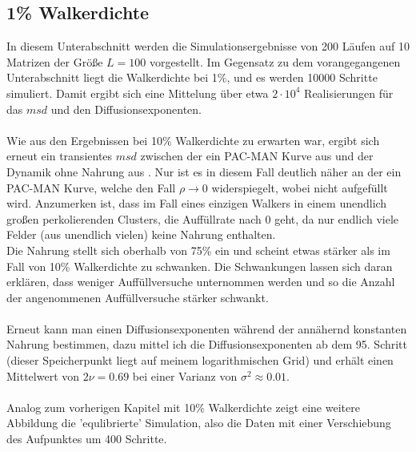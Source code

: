 \documentclass[a4paper, 12pt]{report}
\begin{document}
\subsection{1\% Walkerdichte}

In diesem Unterabschnitt werden die Simulationsergebnisse von 200 Läufen auf 10 Matrizen der Größe $L=100$ vorgestellt. Im Gegensatz zu dem vorangegangenen Unterabschnitt liegt die Walkerdichte bei 1\%, und es werden 10000 Schritte simuliert. Damit ergibt sich eine Mittelung über etwa $2\cdot 10^4$ Realisierungen für das $msd$ und den Diffusionsexponenten.
\\
\\
Wie aus den Ergebnissen bei 10\% Walkerdichte zu erwarten war, ergibt sich erneut ein transientes $msd$ zwischen der ein PAC-MAN Kurve aus \cite{doi:10.1063/1.4999485} und der Dynamik ohne Nahrung aus \cite{PhysRevLett.50.77}. Nur ist es in diesem Fall deutlich näher an der ein PAC-MAN Kurve, welche den Fall $\rho \rightarrow 0$ widerspiegelt, wobei nicht aufgefüllt wird. Anzumerken ist, dass im Fall eines einzigen Walkers in einem unendlich großen perkolierenden Clusters, die Auffüllrate nach $0$ geht, da nur endlich viele Felder (aus unendlich vielen) keine Nahrung enthalten.
\\
Die Nahrung stellt sich oberhalb von 75\% ein und scheint etwas stärker als im Fall von 10\% Walkerdichte zu schwanken. Die Schwankungen lassen sich daran erklären, dass weniger Auffüllversuche unternommen werden und so die Anzahl der angenommenen Auffüllversuche stärker schwankt.
\\
\\
Erneut kann man einen Diffusionsexponenten während der annähernd konstanten Nahrung bestimmen, dazu mittel ich die Diffusionsexponenten ab dem 95. Schritt (dieser Speicherpunkt liegt auf meinem logarithmischen Grid) und erhält einen Mittelwert von $2\nu = 0.69$ bei einer Varianz von $\sigma^2 \approx 0.01 $.
\\
\\
Analog zum vorherigen Kapitel mit 10\% Walkerdichte zeigt eine weitere Abbildung die 'equlibrierte' Simulation, also die Daten mit einer Verschiebung des Aufpunktes um 400 Schritte.
\end{document}

